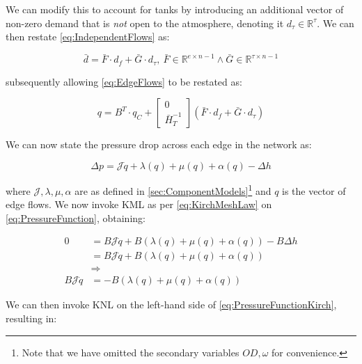 We can modify this to account for tanks by introducing an additional vector of non-zero demand that is \textit{not} open to the atmosphere, denoting it $d_{\tau} \in \mathbb{R}^{\tau}$. We can then restate \cref{eq:IndependentFlows} as:

\begin{equation}\label{eq:IndependentFlowsWithTank}
	\bar{d} = \bar{F}\cdot d_f + \bar{G} \cdot d_{\tau}, 
	\ \bar{F} \in \mathbb{R}^{e \times n-1}
	\wedge 
	\bar{G} \in \mathbb{R}^{\tau \times n-1}
\end{equation}

subsequently allowing \cref{eq:EdgeFlows} to be restated as:

\begin{equation}\label{eq:EdgeFlowsWithTank}
	q = B^T\cdot q_C +
	\begin{bmatrix} 0 \\ \bar{H}_T^{-1} \end{bmatrix} (\bar{F} \cdot d_f + \bar{G} \cdot d_{\tau})
\end{equation}

We can now state the pressure drop across each edge in the network as:

\begin{equation}\label{eq:PressureFunction}
	\Delta p = \mathcal{J}\dot{q} + \lambda(q) + \mu(q) + \alpha(q) -\Delta h
\end{equation}

where $\mathcal{J}, \lambda, \mu, \alpha$ are as defined in \cref{sec:ComponentModels}\footnote{Note that we have omitted the secondary variables $OD,\omega$ for convenience.} and $q$ is the vector of edge flows. We now invoke KML as per \cref{eq:KirchMeshLaw} on \cref{eq:PressureFunction}, obtaining:

\begin{equation}\label{eq:PressureFunctionKirch}
	\begin{split}
			0 &= B\mathcal{J}\dot{q} + B(\lambda(q) + \mu(q) + \alpha(q)) -B\Delta h \\
			&= B\mathcal{J}\dot{q} + B(\lambda(q) + \mu(q) + \alpha(q)) \\
			&\Rightarrow \\
			B\mathcal{J}\dot{q} &= -B(\lambda(q) + \mu(q) + \alpha(q))
	\end{split}
\end{equation}

We can then invoke KNL on the left-hand side of \cref{eq:PressureFunctionKirch}, resulting in:

